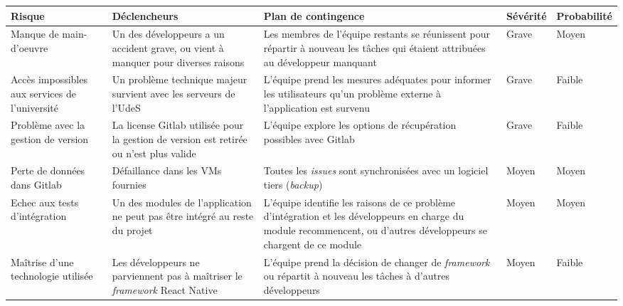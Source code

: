 \renewcommand{\arraystretch}{1.5}
\begin{tabular}{P{0.25\textwidth}P{0.25\textwidth}P{0.25\textwidth}ll}
\hline
\bf Risque & \bf Déclencheurs & \bf Plan de contingence & \bf Sévérité & \bf Probabilité \\
\hline
\hline
Manque de main-d’oeuvre
& Un des développeurs a un accident grave, ou vient à manquer pour diverses raisons
& Les membres de l’équipe restants se réunissent pour répartir à nouveau les tâches qui étaient attribuées au développeur manquant
& Grave
& Moyen \\
%
Accès impossibles aux services de l’université
& Un problème technique majeur survient avec les serveurs de l’UdeS
& L’équipe prend les mesures adéquates pour informer les utilisateurs qu’un problème externe à l’application est survenu
& Grave
& Faible \\
%
Problème avec la gestion de version
& La license Gitlab utilisée pour la gestion de version est retirée ou n’est plus valide
& L’équipe explore les options de récupération possibles avec Gitlab
& Grave
& Faible \\
%
Perte de données dans Gitlab
& Défaillance dans les VMs fournies
& Toutes les \emph{issues} sont synchronisées avec un logiciel tiers (\emph{backup})
& Moyen
& Moyen \\
%
Echec aux tests d’intégration
& Un des modules de l’application ne peut pas être intégré au reste du projet
& L’équipe identifie les raisons de ce problème d’intégration et les développeurs en charge du module recommencent, ou d’autres développeurs se chargent de ce module
& Moyen
& Moyen \\
%
Maîtrise d’une technologie utilisée
& Les développeurs ne parviennent pas à maîtriser le \emph{framework} React Native
& L’équipe prend la décision de changer de \emph{framework} ou répartit à nouveau les tâches à d’autres développeurs
& Moyen
& Faible \\
\hline
\end{tabular}
